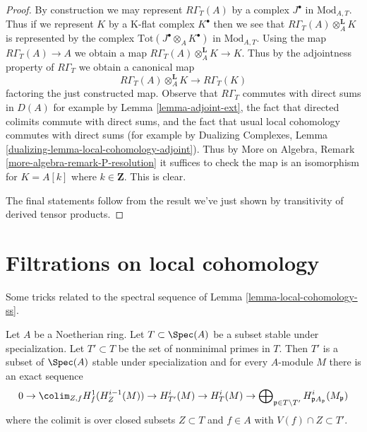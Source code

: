 \begin{proof}
By construction we may represent $R\Gamma_T(A)$ by a complex $J^\bullet$ in
$\text{Mod}_{A, T}$. Thus if we represent $K$ by a K-flat complex $K^\bullet$
then we see that $R\Gamma_T(A) \otimes_A^\mathbf{L} K$ is represented
by the complex $\text{Tot}(J^\bullet \otimes_A K^\bullet)$ in
$\text{Mod}_{A, T}$. Using the map $R\Gamma_T(A) \to A$ we obtain
a map $R\Gamma_T(A) \otimes_A^\mathbf{L} K\to K$. Thus by the adjointness
property of $R\Gamma_T$ we obtain a canonical map
$$
R\Gamma_T(A) \otimes_A^\mathbf{L} K \longrightarrow R\Gamma_T(K)
$$
factoring the just constructed map. Observe that $R\Gamma_T$ commutes
with direct sums in $D(A)$ for example by Lemma \ref{lemma-adjoint-ext},
the fact that directed colimits commute with direct sums, and the
fact that usual local cohomology commutes with direct sums
(for example by Dualizing Complexes, Lemma
\ref{dualizing-lemma-local-cohomology-adjoint}).
Thus by More on Algebra, Remark \ref{more-algebra-remark-P-resolution}
it suffices to check the map is an isomorphism for
$K = A[k]$ where $k \in \mathbf{Z}$. This is clear.

\medskip\noindent
The final statements follow from the result we've just shown
by transitivity of derived tensor products.
\end{proof}





\section{Filtrations on local cohomology}
\label{section-filter-local-cohomology}

\noindent
Some tricks related to the spectral sequence of
Lemma \ref{lemma-local-cohomology-ss}.

\begin{lemma}
\label{lemma-filter-local-cohomology}
Let $A$ be a Noetherian ring. Let $T \subset \Spec(A)$
be a subset stable under specialization. Let $T' \subset T$ be
the set of nonminimal primes in $T$. Then $T'$
is a subset of $\Spec(A)$ stable under specialization
and for every $A$-module $M$ there is an exact sequence
$$
0 \to
\colim_{Z, f} H^1_f(H^{i - 1}_Z(M)) \to
H^i_{T'}(M) \to H^i_T(M) \to
\bigoplus\nolimits_{\mathfrak p \in T \setminus T'}
H^i_{\mathfrak p A_\mathfrak p}(M_\mathfrak p)
$$
where the colimit is over closed subsets $Z \subset T$
and $f \in A$ with $V(f) \cap Z \subset T'$.
\end{lemma}

